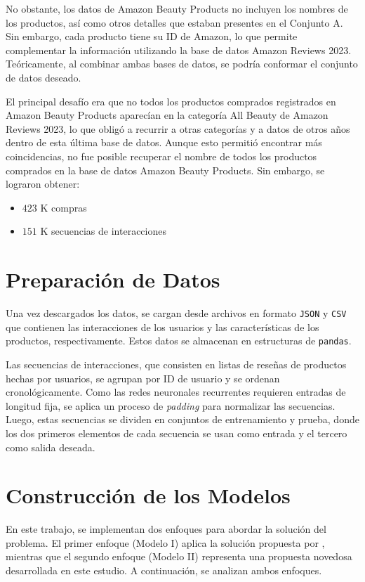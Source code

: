 \documentclass[runningheads]{llncs}
\begin{document}
No obstante, los datos de Amazon Beauty Products no incluyen los nombres de los productos, así como otros detalles que estaban presentes en el Conjunto A. Sin embargo, cada producto tiene su ID de Amazon, lo que permite complementar la información utilizando la base de datos Amazon Reviews 2023. Teóricamente, al combinar ambas bases de datos, se podría conformar el conjunto de datos deseado.

El principal desafío era que no todos los productos comprados registrados en Amazon Beauty Products aparecían en la categoría All Beauty de Amazon Reviews 2023, lo que obligó a recurrir a otras categorías y a datos de otros años dentro de esta última base de datos. Aunque esto permitió encontrar más coincidencias, no fue posible recuperar el nombre de todos los productos comprados en la base de datos Amazon Beauty Products. Sin embargo, se lograron obtener:
\begin{itemize}
	\item $423$ K compras
	\item $151$ K secuencias de interacciones
\end{itemize}

\section{Preparación de Datos}

Una vez descargados los datos, se cargan desde archivos en formato \texttt{JSON} y \texttt{CSV} que contienen las interacciones de los usuarios y las características de los productos, respectivamente. Estos datos se almacenan en estructuras de \texttt{pandas}.

 Las secuencias de interacciones, que consisten en listas de reseñas de productos hechas por usuarios, se agrupan por ID de usuario y se ordenan cronológicamente. Como las redes neuronales recurrentes requieren entradas de longitud fija, se aplica un proceso de \textit{padding} para normalizar las secuencias. Luego, estas secuencias se dividen en conjuntos de entrenamiento y prueba, donde los dos primeros elementos de cada secuencia se usan como entrada y el tercero como salida deseada.

\section{Construcción de los Modelos}
	En este trabajo, se implementan dos enfoques para abordar la solución del problema. El primer enfoque (Modelo I) aplica la solución propuesta por \cite{hidasi2015session}, mientras que el segundo enfoque (Modelo II) representa una propuesta novedosa desarrollada en este estudio. A continuación, se analizan ambos enfoques.
	
\end{document}
